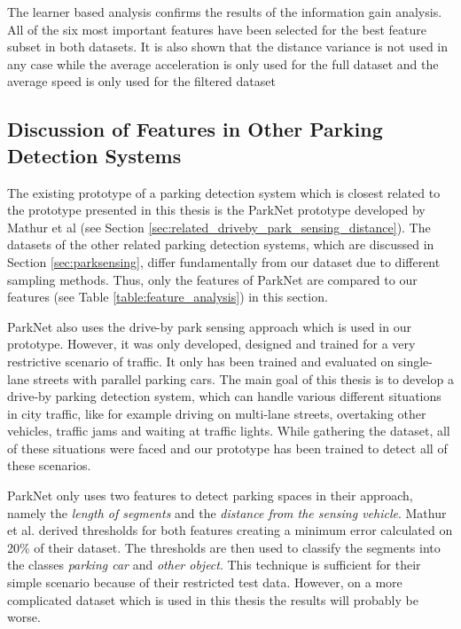 The learner based analysis confirms the results of the information gain analysis. All of the six most important features have been selected for the best feature subset in both datasets. It is also shown that the distance variance is not used in any case while the average acceleration is only used for the full dataset and the average speed is only used for the filtered dataset






\subsection{Discussion of Features in Other Parking Detection Systems}

The existing prototype of a parking detection system which is closest related to the prototype presented in this thesis is the ParkNet prototype developed by Mathur et al \cite{Mathur:2010:PDS:1814433.1814448} (see Section \ref{sec:related_driveby_park_sensing_distance}). The datasets of the other related parking detection systems, which are discussed in Section \ref{sec:parksensing}, differ fundamentally from our dataset due to different sampling methods. Thus, only the features of ParkNet are compared to our features (see Table \ref{table:feature_analysis}) in this section.

ParkNet also uses the drive-by park sensing approach which is used in our prototype. 
However, it was only developed, designed and trained for a very restrictive scenario of traffic. It only has been trained and evaluated on single-lane streets with parallel parking cars.
The main goal of this thesis is to develop a drive-by parking detection system, which can handle various different situations in city traffic, like for example driving on multi-lane streets, overtaking other vehicles, traffic jams and waiting at traffic lights. While gathering the dataset, all of these situations were faced and our prototype has been trained to detect all of these scenarios.

ParkNet only uses two features to detect parking spaces in their approach, namely the \emph{length of segments} and the \emph{distance from the sensing vehicle}. Mathur et al. derived thresholds for both features creating a minimum error calculated on 20\% of their dataset. The thresholds are then used to classify the segments into the classes \emph{parking car} and \emph{other object}. This technique is sufficient for their simple scenario because of their restricted test data. However, on a more complicated dataset which is used in this thesis the results will probably be worse.

